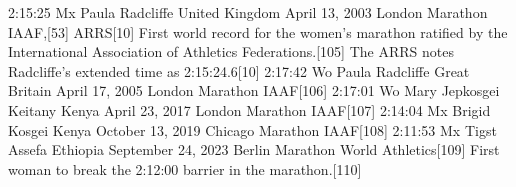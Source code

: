 2:15:25 Mx	Paula Radcliffe	 United Kingdom	April 13, 2003	London Marathon	IAAF,[53] ARRS[10]	First world record for the women's marathon ratified by the International Association of Athletics Federations.[105] The ARRS notes Radcliffe's extended time as 2:15:24.6[10]
2:17:42 Wo	Paula Radcliffe	 Great Britain	April 17, 2005	London Marathon	IAAF[106]	
2:17:01 Wo	Mary Jepkosgei Keitany	 Kenya	April 23, 2017	London Marathon	IAAF[107]	
2:14:04 Mx	Brigid Kosgei	 Kenya	October 13, 2019	Chicago Marathon	IAAF[108]	
2:11:53 Mx	Tigst Assefa	 Ethiopia	September 24, 2023	Berlin Marathon	World Athletics[109]	First woman to break the 2:12:00 barrier in the marathon.[110]